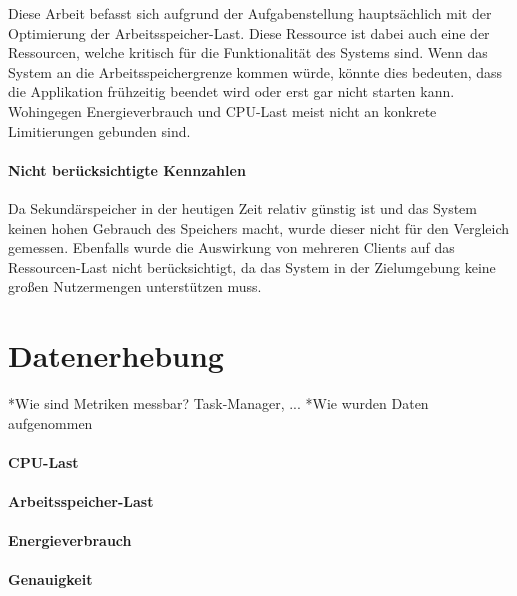 Diese Arbeit befasst sich aufgrund der Aufgabenstellung hauptsächlich mit der Optimierung der Arbeitsspeicher-Last.
Diese Ressource ist dabei auch eine der Ressourcen, welche kritisch für die Funktionalität des Systems sind.
Wenn das System an die Arbeitsspeichergrenze kommen würde, könnte dies bedeuten, dass die Applikation frühzeitig beendet wird oder erst gar nicht starten kann.
Wohingegen Energieverbrauch und CPU-Last meist nicht an konkrete Limitierungen gebunden sind.

\paragraph*{Nicht berücksichtigte Kennzahlen}

Da Sekundärspeicher in der heutigen Zeit relativ günstig ist und das System keinen hohen Gebrauch des Speichers macht, wurde dieser nicht für den Vergleich gemessen.
Ebenfalls wurde die Auswirkung von mehreren Clients auf das Ressourcen-Last nicht berücksichtigt, da das System in der Zielumgebung keine großen Nutzermengen unterstützen muss.


\newpage

\section{Datenerhebung}
*Wie sind Metriken messbar? Task-Manager, ...\newline
*Wie wurden Daten aufgenommen\newline
\paragraph*{CPU-Last}
\paragraph*{Arbeitsspeicher-Last}
\paragraph*{Energieverbrauch}
\paragraph*{Genauigkeit}
\newpage



